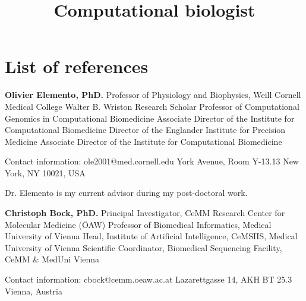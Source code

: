\documentclass[11pt,a4paper,roman]{moderncv} %
\title{Computational biologist}
\begin{document}
\makecvtitle %

\section{List of references}

\begin{list}{--}{}
    \item{}
        {\textbf{Olivier Elemento, PhD.}}\newline
        Professor of Physiology and Biophysics, Weill Cornell Medical College\newline
        Walter B. Wriston Research Scholar\newline
        Professor of Computational Genomics in Computational Biomedicine\newline
        Associate Director of the Institute for Computational Biomedicine\newline
        Director of the Englander Institute for Precision Medicine\newline
        Associate Director of the Institute for Computational Biomedicine

        Contact information:\newline
        \> ole2001@med.cornell.edu\newline
         York Avenue, Room Y-13.13\newline
        \> New York, NY 10021, USA

        Dr. Elemento is my current advisor during my post-doctoral work.\newline

    \item{}
        {\textbf{Christoph Bock, PhD.}}\newline
        Principal Investigator, CeMM Research Center for Molecular Medicine (ÖAW)\newline
        Professor of Biomedical Informatics, Medical University of Vienna\newline
        Head, Institute of Artificial Intelligence, CeMSIIS, Medical University of Vienna\newline
        Scientific Coordinator, Biomedical Sequencing Facility, CeMM \& MedUni Vienna

        Contact information:\newline
        \> cbock@cemm.oeaw.ac.at\newline
        \> Lazarettgasse 14, AKH BT 25.3\newline
         Vienna, Austria


\end{list}
\end{document}
